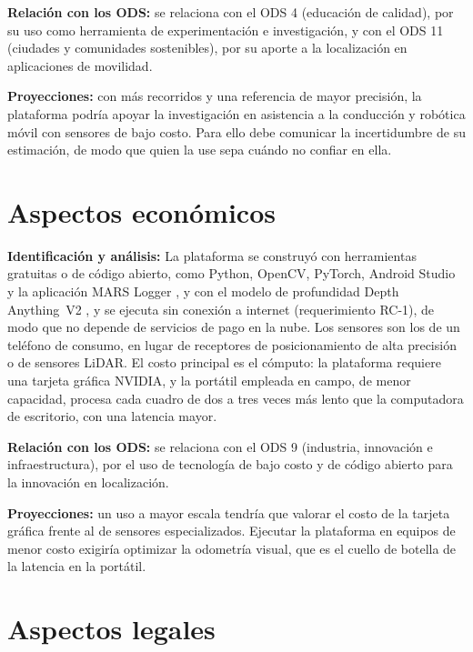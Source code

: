 \textbf{Relación con los ODS:}
se relaciona con el ODS 4 (educación de calidad), por su uso como herramienta de experimentación e investigación, y con el ODS 11 (ciudades y comunidades sostenibles), por su aporte a la localización en aplicaciones de movilidad.

\textbf{Proyecciones:}
con más recorridos y una referencia de mayor precisión, la plataforma podría apoyar la investigación en asistencia a la conducción y robótica móvil con sensores de bajo costo.
Para ello debe comunicar la incertidumbre de su estimación, de modo que quien la use sepa cuándo no confiar en ella.

\section{Aspectos económicos}

\textbf{Identificación y análisis:}
La plataforma se construyó con herramientas gratuitas o de código abierto, como Python, OpenCV, PyTorch, Android Studio y la aplicación MARS Logger \cite{huai2019mars}, y con el modelo de profundidad Depth Anything~V2 \cite{yang2024depthanything}, y se ejecuta sin conexión a internet (requerimiento RC-1), de modo que no depende de servicios de pago en la nube.
Los sensores son los de un teléfono de consumo, en lugar de receptores de posicionamiento de alta precisión o de sensores LiDAR.
El costo principal es el cómputo: la plataforma requiere una tarjeta gráfica NVIDIA, y la portátil empleada en campo, de menor capacidad, procesa cada cuadro de dos a tres veces más lento que la computadora de escritorio, con una latencia mayor.

\textbf{Relación con los ODS:}
se relaciona con el ODS 9 (industria, innovación e infraestructura), por el uso de tecnología de bajo costo y de código abierto para la innovación en localización.

\textbf{Proyecciones:}
un uso a mayor escala tendría que valorar el costo de la tarjeta gráfica frente al de sensores especializados.
Ejecutar la plataforma en equipos de menor costo exigiría optimizar la odometría visual, que es el cuello de botella de la latencia en la portátil.

\section{Aspectos legales}

